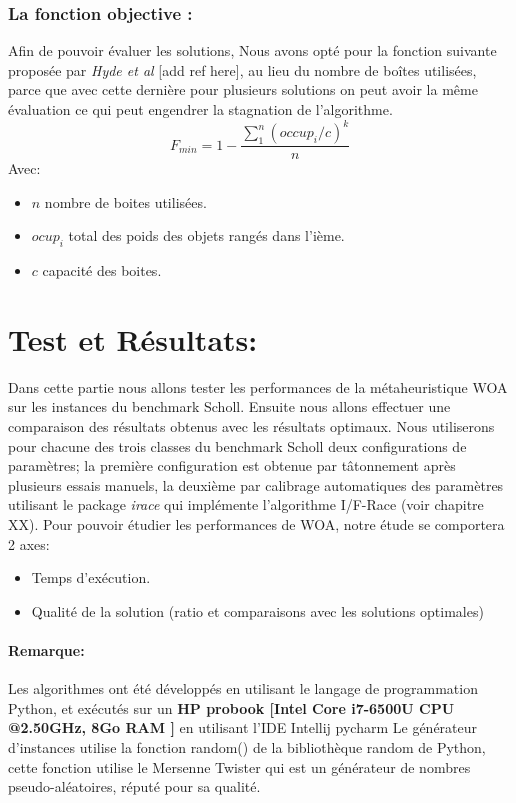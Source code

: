 \documentclass[12pt]{article}
\begin{document}
\subsubsection{La fonction objective :}
Afin de pouvoir évaluer les solutions, Nous avons opté pour la fonction suivante proposée par \emph{Hyde et al} [add ref here], au lieu du nombre de boîtes utilisées, parce que avec cette dernière pour plusieurs solutions on peut avoir la même évaluation ce qui peut engendrer la stagnation de l’algorithme.
\[ F_{min} = 1 - \frac{\sum_{1}^{n} (occup_i / c)^k}{n}\]
Avec:
\begin{itemize}
    \item \(n\) nombre de boites utilisées.
    \item \(ocup_i\) total des poids des objets rangés dans l’ième.
    \item \(c\) capacité des boites.
    
\end{itemize}
\section{Test et Résultats: }
Dans cette partie nous allons tester les performances de la métaheuristique WOA sur les instances du benchmark Scholl. Ensuite nous allons effectuer une comparaison des résultats obtenus avec les résultats optimaux. Nous utiliserons pour chacune des trois classes du benchmark Scholl deux configurations de paramètres; la première configuration est obtenue par tâtonnement après plusieurs essais manuels, la deuxième par calibrage automatiques des paramètres utilisant le package \emph{irace} qui implémente l’algorithme I/F-Race (voir chapitre XX).
Pour pouvoir étudier les performances de WOA, notre étude se comportera 2 axes:
\begin{itemize}
    \item Temps d'exécution.
    \item Qualité de la solution  (ratio et comparaisons avec les solutions optimales)
\end{itemize}

\paragraph{Remarque: } Les algorithmes ont été développés en utilisant le langage de programmation Python, et exécutés sur un \textbf{HP probook [Intel Core i7-6500U CPU @2.50GHz, 8Go RAM ]} en utilisant l'IDE Intellij pycharm
Le générateur d’instances utilise la fonction random() de la bibliothèque random de Python, cette fonction utilise le Mersenne Twister qui est un générateur de nombres pseudo-aléatoires, réputé pour sa qualité.
\end{document}
